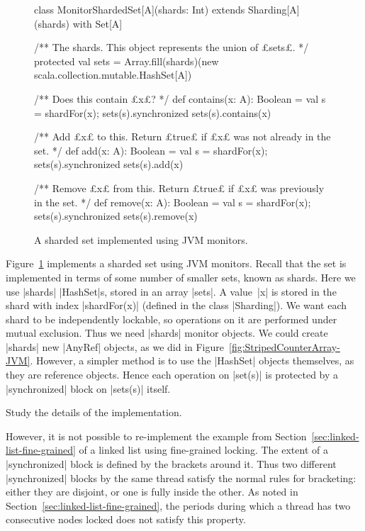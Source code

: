 
\begin{figure}
\begin{scala}
class MonitorShardedSet[A](shards: Int) extends Sharding[A](shards) with Set[A]{
  /** The shards.  This object represents the union of £sets£. */ 
  protected val sets = 
    Array.fill(shards)(new scala.collection.mutable.HashSet[A])

  /** Does this contain £x£? */
  def contains(x: A): Boolean = {
    val s = shardFor(x); sets(s).synchronized{ sets(s).contains(x) }
  }

  /** Add £x£ to this.  Return £true£ if £x£ was not already in the set. */
  def add(x: A): Boolean = {
    val s = shardFor(x); sets(s).synchronized{ sets(s).add(x) }
  }

  /** Remove £x£ from this.  Return £true£ if £x£ was previously in the set. */
  def remove(x: A): Boolean = {
    val s = shardFor(x); sets(s).synchronized{ sets(s).remove(x) }
  }
}
\end{scala}
\caption{A sharded set implemented using JVM monitors.}
\label{fig:MonitorShardedSet}
\end{figure}


Figure~\ref{fig:MonitorShardedSet} implements a sharded set using JVM
monitors.  Recall that the set is implemented in terms of some number of
smaller sets, known as shards.  Here we use |shards| |HashSet|s, stored in an
array |sets|.  A value~|x| is stored in the shard with index |shardFor(x)|
(defined in the class |Sharding|).  We want each shard to be independently
lockable, so operations on it are performed under mutual exclusion.  Thus we
need |shards| monitor objects.  We could
create |shards| new |AnyRef| objects, as we did in
Figure~\ref{fig:StripedCounterArray-JVM}.  However, a simpler method is to use
the |HashSet| objects themselves, as they are reference objects.  Hence each
operation on |set(s)| is protected by a |synchronized| block on |sets(s)|
itself.

\begin{instruction}
Study the details of the implementation.
\end{instruction}


However, it is not possible to re-implement the example from
Section~\ref{sec:linked-list-fine-grained} of a linked list using fine-grained
locking.  The extent of a |synchronized| block is defined by the brackets
around it.  Thus two different |synchronized| blocks by the same thread
satisfy the normal rules for bracketing: either they are disjoint, or one is
fully inside the other.  As noted in
Section~\ref{sec:linked-list-fine-grained}, the periods during which a thread
has two consecutive nodes locked does not satisfy this property.


